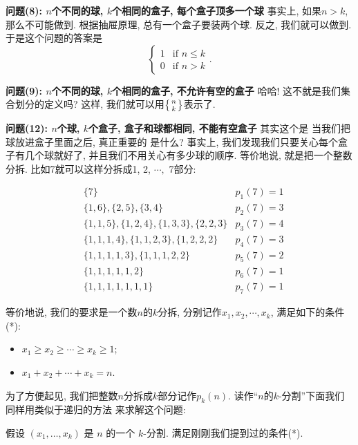 \textbf{问题(8): $n$个不同的球, $k$个相同的盒子, 每个盒子顶多一个球} 事实上, 如果$n>k$, 那么不可能做到.
根据抽屉原理, 总有一个盒子要装两个球. 反之, 我们就可以做到. 于是这个问题的答案是$$\begin{cases}1 & \text{if }n\leq k\\ 0& \text{if }n>k\end{cases}.$$

\textbf{问题(9): $n$个不同的球, $k$个相同的盒子, 不允许有空的盒子} 哈哈! 这不就是我们集合划分的定义吗?
这样, 我们就可以用$\left\{{n \atop k}\right\}$表示了.

\textbf{问题(12): $n$个球, $k$个盒子, 盒子和球都相同, 不能有空盒子} 其实这个是
当我们把球放进盒子里面之后, 真正重要的
是什么? 事实上, 我们发现我们只要关心每个盒子有几个球就好了, 并且我们不用关心有多少球的顺序.
等价地说, 就是把一个整数分拆. 比如7就可以这样分拆成1, 2, $\cdots,$ 7部分:

$$
    \begin{aligned}
         & \{7\}
         & p_1(7)=1                                   \\
         & \{1,6\},\{2,5\},\{3,4\}
         & p_2(7)=3                                   \\
         & \{1,1,5\}, \{1,2,4\}, \{1,3,3\}, \{2,2,3\}
         & p_3(7)=4                                   \\
         & \{1,1,1,4\},\{1,1,2,3\}, \{1,2,2,2\}
         & p_4(7)=3                                   \\
         & \{1,1,1,1,3\},\{1,1,1,2,2\}
         & p_5(7)=2                                   \\
         & \{1,1,1,1,1,2\}
         & p_6(7)=1                                   \\
         & \{1,1,1,1,1,1,1\}
         & p_7(7)=1
    \end{aligned}
$$

等价地说, 我们的要求是一个数$n$的$k$分拆, 分别记作$x_1, x_2, \cdots, x_k$, 满足如下的条件(*):
\begin{itemize}[noitemsep]
    \item  $x_1\ge x_2\ge\cdots\ge x_k\ge 1$;
    \item $x_1+x_2+\cdots+x_k=n$.
\end{itemize}

为了方便起见, 我们把整数$n$分拆成$k$部分记作$p_k(n)$. 读作``$n$的$k$-分割''下面我们同样用类似于递归的方法
来求解这个问题:

假设 \((x_1,\ldots,x_k)\) 是 \(n\) 的一个 \(k\)-分割. 满足刚刚我们提到过的条件(*).

